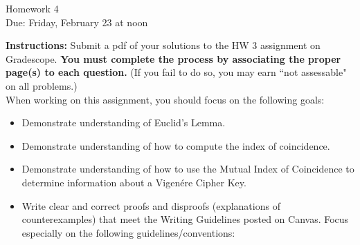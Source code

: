 \documentclass[12pt]{article}
\begin{document}
\begin{center}
{\Large Homework 4}\\
Due: Friday,  February 23 at noon\\


\end{center}
{\bf Instructions:} Submit a pdf of your solutions to the HW 3 assignment on Gradescope.  {\bf You must complete the process by associating the proper page(s) to each question.} (If you fail to do so, you may earn ``not assessable" on all problems.)\\[3pt]

\noindent When working on this assignment, you should focus on the following goals:
\begin{itemize}
\item Demonstrate understanding of Euclid's Lemma.
\item Demonstrate understanding of how to compute the index of coincidence.
\item Demonstrate understanding of how to use the Mutual Index of Coincidence to determine information about a Vigen\'ere Cipher Key.
\item Write clear and correct proofs and disproofs (explanations of counterexamples) that meet the Writing Guidelines posted on Canvas. Focus especially on the following guidelines/conventions:
\end{itemize}
\end{document}
